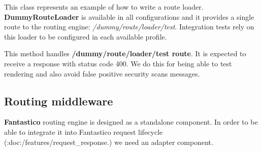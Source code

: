 \documentclass[letterpaper,10pt,english]{sphinxmanual}
\begin{document}
\begin{fulllineitems}
\label{features/routing_engine:fantastico.routing_engine.dummy_routeloader.DummyRouteLoader}
This class represents an example of how to write a route loader. \textbf{DummyRouteLoader} is available in all configurations
and it provides a single route to the routing engine: \emph{/dummy/route/loader/test}. Integration tests rely on this loader
to be configured in each available profile.

\begin{fulllineitems}
\label{features/routing_engine:fantastico.routing_engine.dummy_routeloader.DummyRouteLoader.display_test}
This method handles \textbf{/dummy/route/loader/test route}. It is expected to receive a response with status code 400.
We do this for being able to test rendering and also avoid false positive security scans messages.

\end{fulllineitems}


\end{fulllineitems}



\subsection{Routing middleware}
\label{features/routing_engine:routing-middleware}
\textbf{Fantastico} routing engine is designed as a standalone component. In order to be able to integrate it into Fantastico request
lifecycle (:doc:/features/request\_response.) we need an adapter component.
\end{document}
